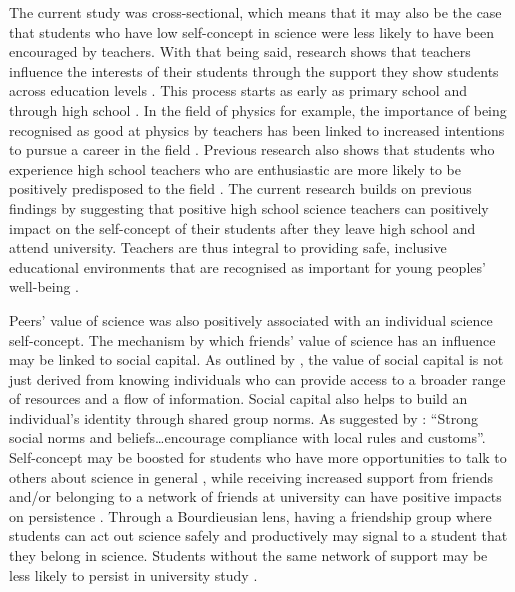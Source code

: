 The current study was cross-sectional, which means that it may also be the case that students who have low self-concept in science were less likely to have been encouraged by teachers. With that being said, research shows that teachers influence the interests of their students through the support they show students across education levels \citep{marjoribanks2006adolescents}. This process starts as early as primary school \citep{fauth2014student} and through high school \citep{marjoribanks2006adolescents,Hazari2017}. In the field of physics for example, the importance of being recognised as good at physics by teachers has been linked to increased intentions to pursue a career in the field \citep{Hazari2017}. Previous research also shows that students who experience high school teachers who are enthusiastic are more likely to be positively predisposed to the field \citep{keller2017impact}. The current research builds on previous findings by suggesting that positive high school science teachers can positively impact on the self-concept of their students after they leave high school and attend university. Teachers are thus integral to providing safe, inclusive educational environments that are recognised as important for young peoples' well-being \citep{wellbeing2019}. 

Peers' value of science was also positively associated with an individual science self-concept. The mechanism by which friends' value of science has an influence may be linked to social capital. As outlined by \cite{lin1999building}, the value of social capital is not just derived from knowing individuals who can provide access to a broader range of resources and a flow of information. Social capital also helps to build an individual's identity through shared group norms. As suggested by \citet[p.29]{Adler2017}: ``Strong social norms and beliefs\ldots encourage compliance with local rules and customs''. Self-concept may be boosted for students who have more opportunities to talk to others about science in general \citep{Archer2015a}, while receiving increased support from friends \citep{bissell2009role} and/or belonging to a network of friends at university can have positive impacts on persistence \citep{thomas2000ties}. Through a Bourdieusian lens, having a friendship group where students can act out science safely and productively may signal to a student that they belong in science. Students without the same network of support may be less likely to persist in university study \citep{thomas2000ties}. 

